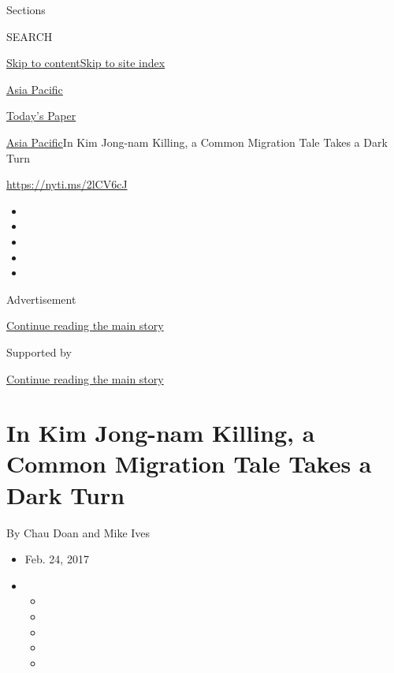 Sections

SEARCH

\protect\hyperlink{site-content}{Skip to
content}\protect\hyperlink{site-index}{Skip to site index}

\href{https://www.nytimes.com/section/world/asia}{Asia Pacific}

\href{https://myaccount.nytimes.com/auth/login?response_type=cookie\&client_id=vi}{}

\href{https://www.nytimes.com/section/todayspaper}{Today's Paper}

\href{/section/world/asia}{Asia Pacific}\textbar{}In Kim Jong-nam
Killing, a Common Migration Tale Takes a Dark Turn

\url{https://nyti.ms/2lCV6cJ}

\begin{itemize}
\item
\item
\item
\item
\item
\end{itemize}

Advertisement

\protect\hyperlink{after-top}{Continue reading the main story}

Supported by

\protect\hyperlink{after-sponsor}{Continue reading the main story}

\hypertarget{in-kim-jong-nam-killing-a-common-migration-tale-takes-a-dark-turn}{%
\section{In Kim Jong-nam Killing, a Common Migration Tale Takes a Dark
Turn}\label{in-kim-jong-nam-killing-a-common-migration-tale-takes-a-dark-turn}}

By Chau Doan and Mike Ives

\begin{itemize}
\item
  Feb. 24, 2017
\item
  \begin{itemize}
  \item
  \item
  \item
  \item
  \item
  \end{itemize}
\end{itemize}

